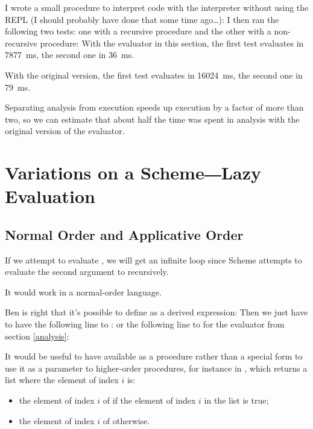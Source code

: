 \begin{exe}[4.24]
    I wrote a small procedure to interpret code with the interpreter without 
    using the REPL (I should probably have done that some time ago…):
    I then ran the following two tests: one with a recursive procedure and the 
    other with a non-recursive procedure:
    With the evaluator in this section, the first test evaluates in 7877~ms, the 
    second one in 36~ms.

    With the original version, the first test evaluates in 16024~ms, the second 
    one in 79~ms.

    Separating analysis from execution speeds up execution by a factor of more 
    than two, so we can estimate that about half the time was spent in analysis 
    with the original version of the evaluator.
\end{exe}

\section{Variations on a Scheme―Lazy Evaluation}

\subsection{Normal Order and Applicative Order}

\begin{exe}[4.25]
    If we attempt to evaluate , we will get an infinite loop 
    since Scheme attempts to evaluate the second argument to  
    recursively.

    It would work in a normal-order language.
\end{exe}

\begin{exe}[4.26]
    Ben is right that it’s possible to define  as a derived 
    expression:
    Then we just have to have the following line to :
    or the following line to  for the evaluator from section 
    \ref{analysis}:

    It would be useful to have  available as a procedure rather 
    than a special form to use it as a parameter to higher-order procedures, for 
    instance in , which returns a list 
    where the element of index $i$ is:
    \begin{itemize}
	\item the element of index $i$ of  if the element of index 
	    $i$ in the list  is true;
	\item the element of index $i$ of  otherwise.
    \end{itemize}
\end{exe}

